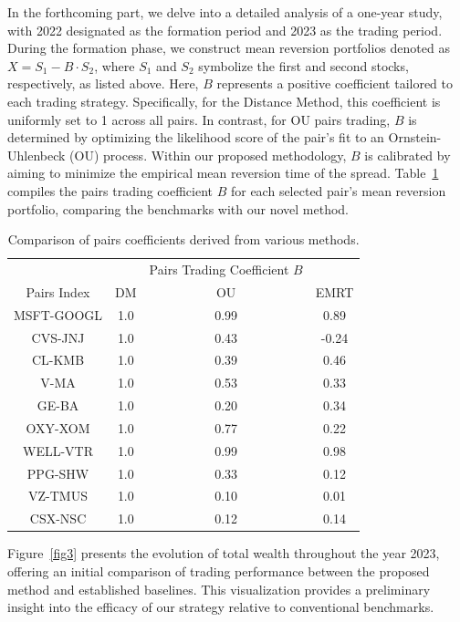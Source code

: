 \documentclass{article}
\begin{document}
In the forthcoming part, we delve into a detailed analysis of a one-year study, with 2022 designated as the formation period and 2023 as the trading period. During the formation phase, we construct mean reversion portfolios denoted as \(X = S_1 - B\cdot S_2\), where \(S_1\) and \(S_2\) symbolize the first and second stocks, respectively, as listed above. Here, \(B\) represents a positive coefficient tailored to each trading strategy. Specifically, for the Distance Method, this coefficient is uniformly set to 1 across all pairs. In contrast, for OU pairs trading, \(B\) is determined by optimizing the likelihood score of the pair's fit to an Ornstein-Uhlenbeck (OU) process. Within our proposed methodology, \(B\) is calibrated by aiming to minimize the empirical mean reversion time of the spread. Table~\ref{tab2} compiles the pairs trading coefficient \(B\) for each selected pair's mean reversion portfolio, comparing the benchmarks with our novel method. 
\begin{table}%
\centering
\begin{tabular}{c|ccc}
\toprule
                   & & Pairs Trading Coefficient $B$& \\
Pairs Index & DM & OU & EMRT\\
\midrule
MSFT-GOOGL    &   1.0 & 0.99  &  0.89 \\
CVS-JNJ       &   1.0 & 0.43  & -0.24 \\
CL-KMB        &   1.0 & 0.39  &  0.46 \\
V-MA          &   1.0 & 0.53  &  0.33 \\
GE-BA         &   1.0 & 0.20  &  0.34 \\
OXY-XOM       &   1.0 & 0.77  &  0.22 \\
WELL-VTR      &   1.0 & 0.99  &  0.98 \\
PPG-SHW       &   1.0 & 0.33  &  0.12 \\
VZ-TMUS       &   1.0 & 0.10  &  0.01 \\
CSX-NSC       &   1.0 & 0.12  &  0.14 \\
\bottomrule
\end{tabular} 
\caption{Comparison of pairs coefficients derived from various methods.}
\label{tab2} 
\end{table}

Figure~\ref{fig3} presents the evolution of total wealth throughout the year 2023, offering an initial comparison of trading performance between the proposed method and established baselines. This visualization provides a preliminary insight into the efficacy of our strategy relative to conventional benchmarks.
\end{document}
